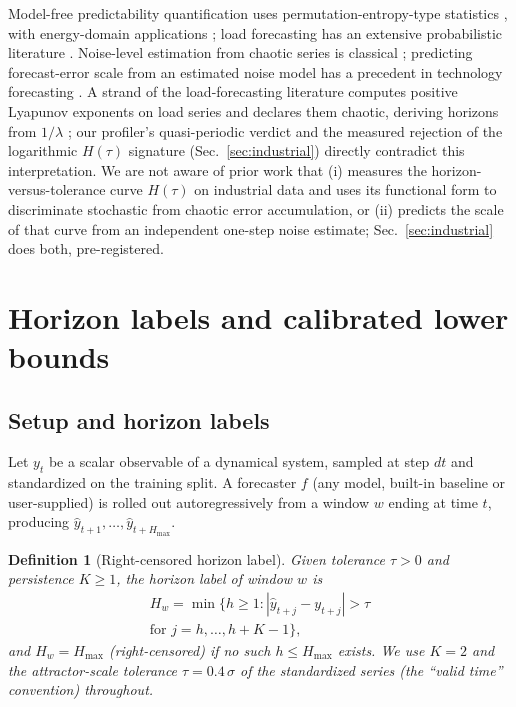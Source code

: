 \documentclass[aps,pre,twocolumn,superscriptaddress,nofootinbib,longbibliography]{revtex4-2}
\newtheorem{definition}{Definition}
\newcommand{\Hw}{H_w}
\newcommand{\Hmax}{H_{\max}}
\begin{document}
Model-free predictability quantification uses permutation-entropy-type
statistics \citep{bandt2002permutation,garland2014model,
pennekamp2019intrinsic}, with energy-domain applications
\citep{karimiarpanahi2023quantifying}; load forecasting has an extensive
probabilistic literature \citep{hong2016probabilistic}. Noise-level
estimation from chaotic series is classical
\citep{schreiber1993determination}; predicting forecast-error scale from
an estimated noise model has a precedent in technology forecasting
\citep{farmer2016predictable}. A strand of the load-forecasting
literature computes positive Lyapunov exponents on load series and
declares them chaotic, deriving horizons from $1/\lambda$
\citep{li2011application,stergiou2021application}; our profiler's
quasi-periodic verdict and the measured rejection of the logarithmic
$H(\tau)$ signature (Sec.~\ref{sec:industrial}) directly contradict this
interpretation. We are not aware of prior work that (i) measures the
horizon-versus-tolerance curve $H(\tau)$ on industrial data and uses its
functional form to discriminate stochastic from chaotic error
accumulation, or (ii) predicts the scale of that curve from an
independent one-step noise estimate; Sec.~\ref{sec:industrial} does both,
pre-registered.

\section{Horizon labels and calibrated lower bounds}
\label{sec:framework}

\subsection{Setup and horizon labels}

Let $y_t$ be a scalar observable of a dynamical system, sampled at step
$dt$ and standardized on the training split. A forecaster $f$ (any model,
built-in baseline or user-supplied) is rolled out autoregressively from a
window $w$ ending at time $t$, producing $\hat y_{t+1}, \dots,
\hat y_{t+\Hmax}$.

\begin{definition}[Right-censored horizon label]
\label{def:label}
Given tolerance $\tau > 0$ and persistence $K \ge 1$, the horizon label of
window $w$ is
\begin{multline}
\Hw = \min\{h \ge 1 : |\hat y_{t+j} - y_{t+j}| > \tau \\
\text{for } j = h, \dots, h+K-1\},
\end{multline}
and $\Hw = \Hmax$ (right-censored) if no such $h \le \Hmax$ exists. We use
$K=2$ and the attractor-scale tolerance $\tau = 0.4\,\sigma$ of the
standardized series (the ``valid time'' convention) throughout.
\end{definition}
\end{document}

